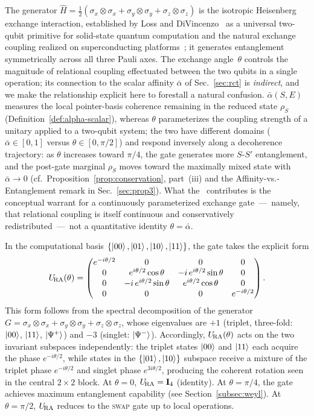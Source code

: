 The generator $\hat{H} = \tfrac{1}{2}(\sigma_x\otimes\sigma_x +
\sigma_y\otimes\sigma_y + \sigma_z\otimes\sigma_z)$ is the isotropic
Heisenberg exchange interaction, established by Loss and
DiVincenzo~\cite{LossDiVincenzo1998} as a universal two-qubit primitive
for solid-state quantum computation and the natural exchange coupling
realized on superconducting platforms~\cite{Krantz2019};
it generates entanglement symmetrically across all three Pauli axes.
The exchange angle~$\theta$ controls the magnitude of relational coupling
effectuated between the two qubits in a single operation; its connection
to the scalar affinity $\bar\alpha$ of Sec.~\ref{sec:rct} is
\emph{indirect}, and we make the relationship explicit here to forestall
a natural confusion.
$\bar\alpha(S,E)$ measures the local pointer-basis coherence remaining in
the reduced state $\rho_S$ (Definition~\ref{def:alpha-scalar}), whereas
$\theta$ parameterizes the coupling strength of a unitary applied to a
two-qubit system; the two have different domains
($\bar\alpha \in [0,1]$ versus $\theta \in [0,\pi/2]$) and respond
inversely along a decoherence trajectory: as $\theta$ increases toward
$\pi/4$, the gate generates more $S$-$S'$ entanglement, and the
post-gate marginal $\rho_S$ moves toward the maximally mixed state with
$\bar\alpha \to 0$ (cf.\ Proposition~\ref{prop:conservation}, part~(iii)
and the Affinity-vs.-Entanglement remark in Sec.~\ref{sec:prop3}).
What the \RCT~contributes is the conceptual warrant for a continuously
parameterized exchange gate~---~namely, that relational coupling is
itself continuous and conservatively redistributed~---~not a
quantitative identity $\theta = \bar\alpha$.

In the computational basis $\{\ket{00}, \ket{01}, \ket{10}, \ket{11}\}$,
the gate takes the explicit form
\begin{equation}
  U_{\!\mathrm{RA}}(\theta) =
  \begin{pmatrix}
    e^{-i\theta/2} & 0 & 0 & 0 \\
    0 & e^{i\theta/2}\cos\theta & {-i}\,e^{i\theta/2}\sin\theta & 0 \\
    0 & {-i}\,e^{i\theta/2}\sin\theta & e^{i\theta/2}\cos\theta & 0 \\
    0 & 0 & 0 & e^{-i\theta/2}
  \end{pmatrix}.
  \label{eq:URA-matrix}
\end{equation}
This form follows from the spectral decomposition of the generator $G =
\sigma_x\!\otimes\!\sigma_x + \sigma_y\!\otimes\!\sigma_y + \sigma_z\!\otimes\!\sigma_z$,
whose eigenvalues are $+1$ (triplet, three-fold: $\ket{00}$, $\ket{11}$,
$\ket{\Psi^+}$) and $-3$ (singlet: $\ket{\Psi^-}$).
Accordingly, $U_{\!\mathrm{RA}}(\theta)$ acts on the two invariant subspaces independently:
the triplet states $\ket{00}$ and $\ket{11}$ each acquire the phase $e^{-i\theta/2}$,
while states in the $\{\ket{01},\ket{10}\}$ subspace receive a mixture of
the triplet phase $e^{-i\theta/2}$ and singlet phase $e^{3i\theta/2}$,
producing the coherent rotation seen in the central $2\times2$ block.
At $\theta = 0$, $U_{\!\mathrm{RA}} = \mathbf{I}_4$ (identity).
At $\theta = \pi/4$, the gate achieves maximum entanglement capability
(see Section~\ref{subsec:weyl}).
At $\theta = \pi/2$, $U_{\!\mathrm{RA}}$ reduces to the \textsc{swap} gate up to
local operations.

